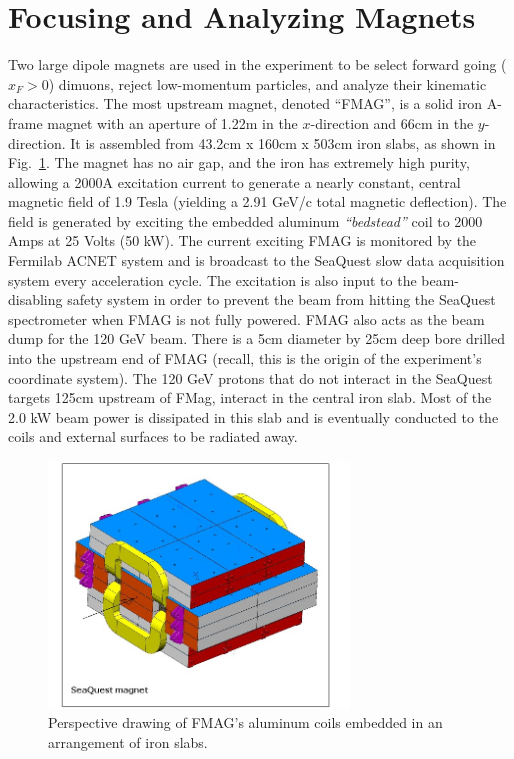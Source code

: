 \section{Focusing and Analyzing Magnets}

Two large dipole magnets are used in the experiment to be select forward going ($x_F > 0$) dimuons, reject low-momentum particles, and analyze their kinematic characteristics. The most upstream magnet, denoted ``FMAG'', is a solid iron A-frame magnet with an aperture of 1.22m in the $x$-direction and 66cm in the $y$-direction. It is assembled from 43.2cm x 160cm x 503cm iron slabs, as shown in Fig.~\ref{fig:FMag}. The magnet has no air gap, and the iron has extremely high purity, allowing a 2000A excitation current to generate a nearly constant, central magnetic field of 1.9 Tesla (yielding a 2.91 GeV/c total magnetic deflection). The field is generated by exciting the embedded aluminum \emph{``bedstead''} coil to 2000 Amps at 25 Volts (50 kW).  The current exciting FMAG is monitored by the Fermilab ACNET system and is broadcast to the SeaQuest slow data acquisition system every acceleration cycle. The excitation is also input to the beam-disabling safety system in order to prevent the beam from hitting the SeaQuest spectrometer when FMAG is not fully powered. FMAG also acts as the beam dump for the 120 GeV beam. There is a 5cm diameter by 25cm deep bore drilled into the upstream end of FMAG (recall, this is the origin of the experiment's coordinate system).  The 120 GeV protons that do not interact in the SeaQuest targets 125cm upstream of FMag, interact in the central iron slab.  Most of the 2.0 kW beam power is dissipated in this slab and is eventually conducted to the coils and external surfaces to be radiated away.

\begin{figure}
	\centering
	\includegraphics[width=8cm]{figures/apparatus/FMAG}
	\caption{Perspective drawing of FMAG's aluminum coils embedded in an arrangement of iron slabs.}
	\label{fig:FMag}
\end{figure}

